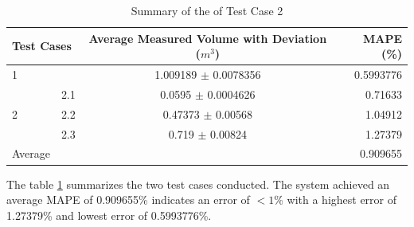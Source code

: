 \begin{table}[H]
	\centering
	\caption{Summary of the of Test Case 2}
	\label{ch4:tab:test-cases-summary}
	\begin{tabular}{l l c r}
		\toprule
		\multicolumn{2}{l}{\textbf{Test Cases}} & \textbf{Average Measured Volume with Deviation ($m^{3}$)} & \textbf{MAPE (\%)}                \\ \midrule

		\multicolumn{2}{l}{1}                   & 1.009189 $\pm$ 0.0078356                                  & 0.5993776                         \\

		{}                                      & 2.1                                                       & 0.0595 $\pm$ 0.0004626 & 0.71633  \\

		2                                       & 2.2                                                       & 0.47373 $\pm$ 0.00568  & 1.04912  \\

		{}                                      & 2.3                                                       & 0.719 $\pm$ 0.00824    & 1.27379  \\ \midrule

		Average                                 & {}                                                        & {}                     & 0.909655 \\ \bottomrule
	\end{tabular}
\end{table}

The table \ref{ch4:tab:test-cases-summary} summarizes the two test cases conducted. The system achieved an average MAPE of 0.909655\% indicates an error of $<1\%$ with a highest error of 1.27379\% and lowest error of 0.5993776\%.